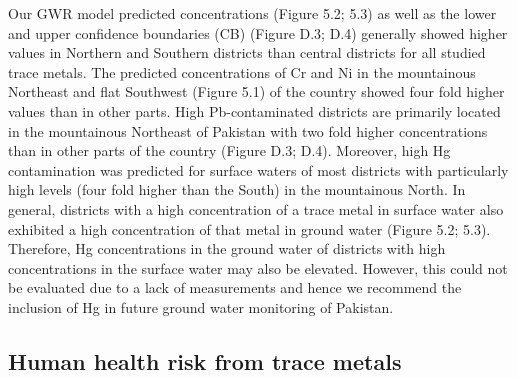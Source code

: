 Our GWR model predicted concentrations (Figure 5.2; 5.3) as well as the lower and upper confidence boundaries (CB) (Figure D.3; D.4) generally showed higher values in Northern and Southern districts than central districts for all studied trace metals. The predicted concentrations of Cr and Ni in the mountainous Northeast and flat Southwest (Figure 5.1) of the country showed four fold higher values than in other parts. High Pb-contaminated districts are primarily located in the mountainous Northeast of Pakistan with two fold higher concentrations than in other parts of the country (Figure D.3; D.4). Moreover, high Hg contamination was predicted for surface waters of most districts with particularly high levels (four fold higher than the South) in the mountainous North. In general, districts with a high concentration of a trace metal in surface water also exhibited a high concentration of that metal in ground water (Figure 5.2; 5.3). Therefore, Hg concentrations in the ground water of districts with high concentrations in the surface water may also be elevated. However, this could not be evaluated due to a lack of measurements and hence we recommend the inclusion of Hg in future ground water monitoring of Pakistan.

\subsection{Human health risk from trace metals}
\label{Human health risk from trace metals}

